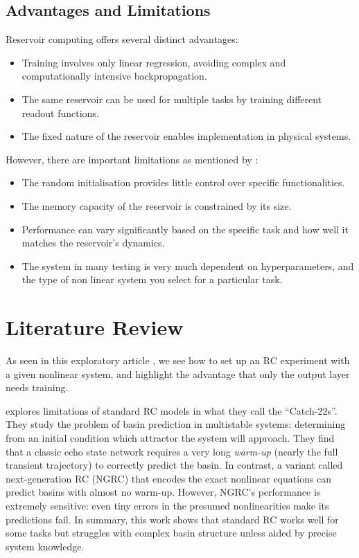 \documentclass[numbered]{ivt-style/standard}
\begin{document}
\subsection{Advantages and Limitations}

Reservoir computing offers several distinct advantages:
\begin{itemize}
    \item Training involves only linear regression, avoiding complex and computationally intensive backpropagation.
    \item The same reservoir can be used for multiple tasks by training different readout functions.
    \item The fixed nature of the reservoir enables implementation in physical systems.
\end{itemize}


However, there are important limitations as mentioned by \cite{article_catch_22s_rc}: 
\begin{itemize}
    \item The random initialisation provides little control over specific functionalities.
    \item The memory capacity of the reservoir is constrained by its size.
    \item Performance can vary significantly based on the specific task and how well it matches the reservoir's dynamics. \cite{article_RC_intro}
    \item The system in many testing is very much dependent on hyperparameters, and the type of non linear system you select for a particular task.
\end{itemize}



\section{Literature Review}

As seen in this exploratory article \cite{article_RC_intro}, we see how to set up an RC experiment with a given nonlinear system, and highlight the advantage that only the output layer needs training.  

\cite{article_catch_22s_rc} explores limitations of standard RC models in what they call the “Catch-22s”.  They study the problem of basin prediction in multistable systems: determining from an initial condition which attractor the system will approach.  They find that a classic echo state network requires a very long \textit{warm-up} (nearly the full transient trajectory) to correctly predict the basin.  In contrast, a variant called next-generation RC (NGRC) that encodes the exact nonlinear equations can predict basins with almost no warm-up.  However, NGRC’s performance is extremely sensitive: even tiny errors in the presumed nonlinearities make its predictions fail.  In summary, this work shows that standard RC works well for some tasks but struggles with complex basin structure unless aided by precise system knowledge.
\end{document}

